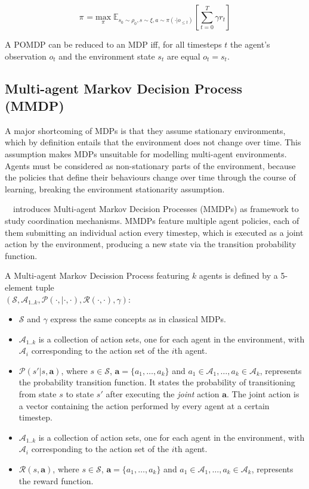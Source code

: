 \documentclass{../main.tex}{}
\begin{document}
        \begin{equation}
        \pi^{} = \underset{\pi}{\text{max}}\;  \mathbb{E}_{s_0 \sim \rho_0, s \sim \xi, a \sim \pi(\cdot | o_{\leq t})}[\sum_{t=0}^{T} \gamma r_t]
        \end{equation}

A POMDP can be reduced to an MDP iff, for all timesteps $t$ the agent's observation $o_t$ and the environment state $s_t$ are equal $o_t = s_t$.

\subsection{Multi-agent Markov Decision Process (MMDP)}

A major shortcoming of MDPs is that they assume stationary environments, which by definition entails that the environment does not change over time. This assumption makes MDPs unsuitable for modelling multi-agent environments. Agents must be considered as non-stationary parts of the environment, because the policies that define their behaviours change over time through the course of learning, breaking the environment stationarity assumption.

~\cite{Boutilier1996}~introduces Multi-agent Markov Decision Processes (MMDPs) as framework to study coordination mechanisms. MMDPs feature multiple agent policies, each of them submitting an individual action every timestep, which is executed as a joint action by the environment, producing a new state via the transition probability function. 

A Multi-agent Markov Decission Process featuring $k$ agents is defined by a 5-element tuple \\ $(\mathcal{S}, \mathcal{A}_{1..k}, \mathcal{P}(\cdot, | \cdot, \cdot), \mathcal{R}(\cdot, \cdot), \gamma)$:
\begin{itemize}
    \item $\mathcal{S}$ and $\gamma$ express the same concepts as in classical MDPs.
    \item $\mathcal{A}_{1..k}$ is a collection of action sets, one for each agent in the environment, with $\mathcal{A}_i$ corresponding to the action set of the $i$th agent.
    \item $\mathcal{P}(s' | s, \mathbf{a})$, where $s \in \mathcal{S}$, $\mathbf{a} = \{a_1,\ldots,a_k\}$ and $a_1 \in \mathcal{A}_1, \ldots, a_k \in \mathcal{A}_k$, represents the probability transition function. It states the probability of transitioning from state $s$ to state $s'$ after executing the \textit{joint} action $\mathbf{a}$. The joint action is a vector containing the action performed by every agent at a certain timestep.    \item $\mathcal{A}_{1..k}$ is a collection of action sets, one for each agent in the environment, with $\mathcal{A}_i$ corresponding to the action set of the $i$th agent.
    \item $\mathcal{R}(s, \mathbf{a})$, where $s \in \mathcal{S}$, $\mathbf{a} = \{a_1,\ldots,a_k\}$ and $a_1 \in \mathcal{A}_1, \ldots, a_k \in \mathcal{A}_k$, represents the reward function.
\end{itemize}
\end{document}
